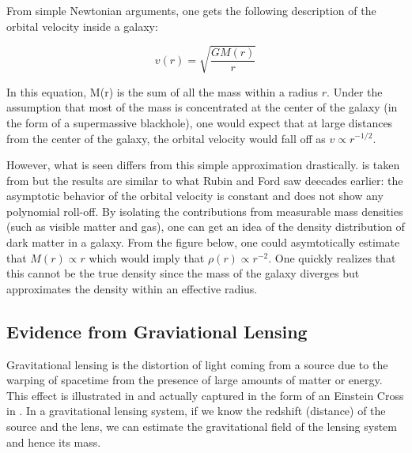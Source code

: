 	From simple Newtonian arguments, one gets the following description of the orbital velocity inside a galaxy:
	
\begin{equation}
v(r) = \sqrt{\frac{G M(r)}{r}}
\end{equation}	

In this equation, M(r) is the sum of all the mass within a radius $r$.  Under the assumption that most of the mass is concentrated at the center of the galaxy (in the form of a supermassive blackhole), one would expect that at large distances from the center of the galaxy, the orbital velocity would fall off as $v \propto r^{-1/2}$.

However, what is seen differs from this simple approximation drastically.   is taken from  but the results are similar to what Rubin and Ford saw deecades earlier: the asymptotic behavior of the orbital velocity is constant and does not show any polynomial roll-off.  By isolating the contributions from measurable mass densities (such as visible matter and gas), one can get an idea of the density distribution of dark matter in a galaxy.  From the figure below, one could asymtotically estimate that $M(r) \propto r$ which would imply that $\rho(r) \propto r^{-2}$.  One quickly realizes that this cannot be the true density since the mass of the galaxy diverges but approximates the density within an effective radius.



\subsection{Evidence from Graviational Lensing}	

Gravitational lensing is the distortion of light coming from a source due to the warping of spacetime from the presence of large amounts of matter or energy.  This effect is illustrated in  and actually captured in the form of an Einstein Cross in .  In a gravitational lensing system, if we know the redshift (distance) of the source and the lens, we can estimate the gravitational field of the lensing system and hence its mass.


